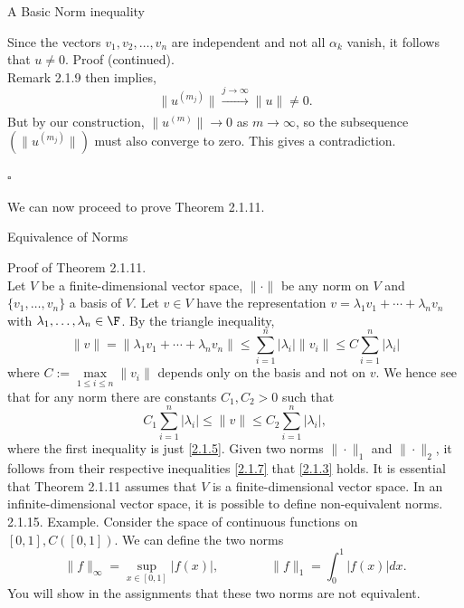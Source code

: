\documentclass[smaller,hyperref={CJKbookmarks=true}]{beamer}
\newcommand{\myseries}[2]{$#1_1,#1_2,\dots,#1_#2$}
\begin{document}
\begin{frame}{A Basic Norm inequality}
\begin{spacing}{1.1}
Since the vectors \myseries{v}{n} are independent and not all $\alpha_k$ vanish, it follows that $u\neq0$.
\newpage
\alert{Proof (continued).}\\
Remark 2.1.9 then implies,
\[\|u^{(m_j)}\|\xrightarrow[]{j\to\infty}\|u\|\neq0.\]
But by our construction, $\|u^{(m)}\|\to 0$ as $m\to\infty$, so the subsequence $(\|u^{(m_j)}\|)$ must also converge to zero. This gives a contradiction.
\begin{flushright}
  $\square$
\end{flushright}
We can now proceed to prove Theorem 2.1.11.
\end{spacing}
\end{frame}
\begin{frame}{Equivalence of Norms}
\begin{spacing}{1.05}
\alert{Proof of Theorem 2.1.11.}\\
Let $V$ be a finite-dimensional vector space, $\|\cdot\|$ be any norm on $V$ and $\{v_1,\ldots,v_n\}$ a basis of $V$. Let $v\in V$ have the representation $v=\lambda_1v_1+\cdots+\lambda_nv_n$ with $\lambda_1,\ldots,\lambda_n\in\F$. By the triangle inequality,
\[\|v\|=\|\lambda_1v_1+\cdots+\lambda_nv_n\|\leq\sum_{i=1}^{n}|\lambda_i|\|v_i\|\leq C\sum_{i=1}^{n}|\lambda_i|\]
where $C:=\max\limits_{1\leq i\leq n}\|v_i\|$ depends only on the basis and not on $v$. We hence see that for any norm there are constants $C_1,C_2>0$ such that
\begin{equation}\label{2.1.7}
  C_1\sum_{i=1}^{n}|\lambda_i|\leq\|v\|\leq C_2\sum_{i=1}^{n}|\lambda_i|,
\end{equation}
where the first inequality is just \eqref{2.1.5}. Given two norms $\|\cdot\|_1$ and $\|\cdot\|_2$, it follows from their respective inequalities \eqref{2.1.7} that \eqref{2.1.3} holds.
\newpage
It is essential that Theorem 2.1.11 assumes that $V$ is a finite-dimensional
vector space. In an infinite-dimensional vector space, it is possible to
define non-equivalent norms.\\[5pt]
\alert{2.1.15. Example.} Consider the space of continuous functions on $[0,1],C([0,1])$. We can define the two norms
\[\|f\|_{\infty}=\sup\limits_{x\in[0,1]}|f(x)|,\qquad\qquad
\|f\|_1=\int_{0}^{1}|f(x)|dx.\]
You will show in the assignments that these two norms are not equivalent.
\end{spacing}
\end{frame}
\end{document}
